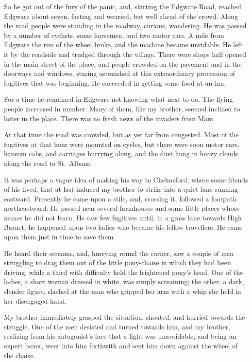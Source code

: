 So he got out of the fury of the panic, and, skirting the Edgware
Road, reached Edgware about seven, fasting and wearied, but well
ahead of the crowd. Along the road people were standing in the
roadway, curious, wondering. He was passed by a number of cyclists,
some horsemen, and two motor cars. A mile from Edgware the rim of
the wheel broke, and the machine became unridable. He left it by
the roadside and trudged through the village. There were shops half
opened in the main street of the place, and people crowded on the
pavement and in the doorways and windows, staring astonished at
this extraordinary procession of fugitives that was beginning. He
succeeded in getting some food at an inn.

For a time he remained in Edgware not knowing what next to do. The
flying people increased in number. Many of them, like my brother,
seemed inclined to loiter in the place. There was no fresh news of
the invaders from Mars.

At that time the road was crowded, but as yet far from congested.
Most of the fugitives at that hour were mounted on cycles, but
there were soon motor cars, hansom cabs, and carriages hurrying
along, and the dust hung in heavy clouds along the road to St.\ Albans.

It was perhaps a vague idea of making his way to Chelmsford, where
some friends of his lived, that at last induced my brother to
strike into a quiet lane running eastward. Presently he came upon a
stile, and, crossing it, followed a footpath northeastward. He
passed near several farmhouses and some little places whose names
he did not learn. He saw few fugitives until, in a grass lane
towards High Barnet, he happened upon two ladies who became his
fellow travellers. He came upon them just in time to save them.

He heard their screams, and, hurrying round the corner, saw a
couple of men struggling to drag them out of the little pony-chaise
in which they had been driving, while a third with difficulty held
the frightened pony's head. One of the ladies, a short woman
dressed in white, was simply screaming; the other, a dark, slender
figure, slashed at the man who gripped her arm with a whip she held
in her disengaged hand.

My brother immediately grasped the situation, shouted, and hurried
towards the struggle. One of the men desisted and turned towards
him, and my brother, realising from his antagonist's face that a
fight was unavoidable, and being an expert boxer, went into him
forthwith and sent him down against the wheel of the chaise.

